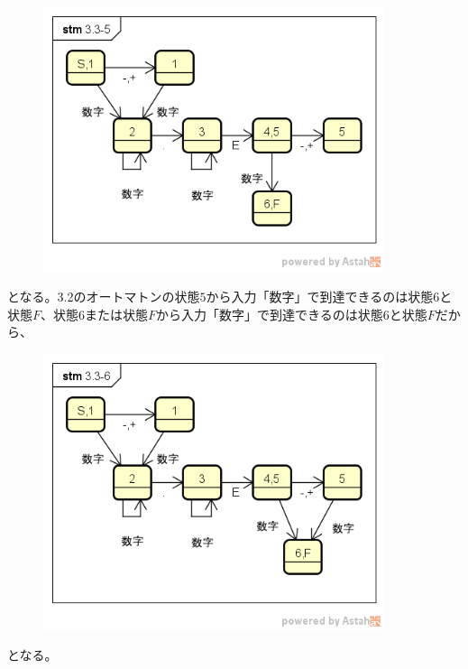 \documentclass[a4paper,12pt]{jarticle}
\begin{document}
\begin{figure}[H]
 \begin{center}
  \includegraphics[width=10cm]{Automatonfig/3-3-5.png}
 \end{center}
\end{figure}
となる。3.2のオートマトンの状態$ 5 $から入力「$ 数字 $」で到達できるのは状態$ 6 $と状態$ F $、状態$ 6 $または状態$ F $から入力「$ 数字 $」で到達できるのは状態$ 6 $と状態$ F $だから、
\begin{figure}[H]
 \begin{center}
  \includegraphics[width=10cm]{Automatonfig/3-3-6.png}
 \end{center}
\end{figure}
となる。
\end{document}
